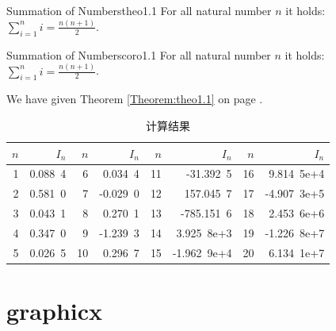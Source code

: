\begin{theo}{Summation of Numbers}{theo1.1}
  For all natural number $n$ it holds:\\[2mm]
  $\displaystyle\sum\limits_{i=1}^n i = \frac{n(n+1)}{2}$.
\end{theo}

\begin{coro}{Summation of Numbers}{coro1.1}
  For all natural number $n$ it holds:\\[2mm]
  $\displaystyle\sum\limits_{i=1}^n i = \frac{n(n+1)}{2}$.
\end{coro}
We have given Theorem \ref{Theorem:theo1.1} on page \pageref{Theorem:theo1.1}.



\begin{table}[h]\begin{center}\color{darkblue}\caption{计算结果}\color{black}\label{tab1-1}
{\footnotesize
\begin{tabular}{r|r||r|r||r|r||r|r}\arrayrulecolor{darkblue}\hline\rowcolor{lightblue}
  $n$&$I_n$&$n$&$I_n$&$n$&$I_n$&$n$&$I_n$\\\hline
  1&0.088\ 4&6&0.034\ 4&11&-31.392\ 5&16&9.814\ 5e+4\\
  2&0.581\ 0&7&-0.029\ 0&12&157.045\ 7&17&-4.907\ 3e+5\\
  3&0.043\ 1&8&0.270\ 1&13&-785.151\ 6&18&2.453\ 6e+6\\
  4&0.347\ 0&9&-1.239\ 3&14&3.925\ 8e+3&19&-1.226\ 8e+7\\
  5&0.026\ 5&10&0.296\ 7&15&-1.962\ 9e+4&20&6.134\ 1e+7\\\hline
\end{tabular}}\end{center}\end{table}

\section{graphicx}

